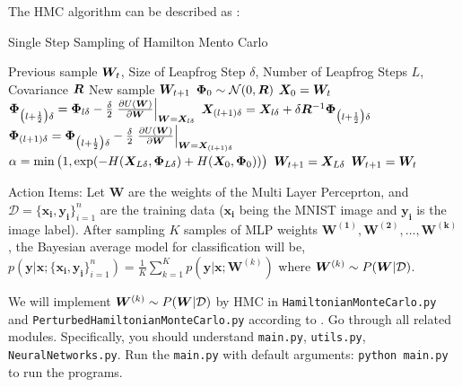 The HMC algorithm can be described as :
\begin{algorithm}
\caption{Single Step Sampling of Hamilton Mento Carlo}
\label{alg:hmc}
\begin{algorithmic}
\Require Previous sample $\bm{W}_{t}$, Size of Leapfrog Step $\delta$, Number of
Leapfrog Steps $L$, Covariance $\bm{R}$
\Ensure New sample $\bm{W}_{t + 1}$
\State $\bm{\Phi}_{0} \sim \mathcal{N}(0, \bm{R})$
\State $\bm{X}_{0} = \bm{W}_{t}$
    \State $\bm{\Phi}_{\big( l + \frac{1}{2} \big) \delta} = \bm{\Phi}_{l \delta} -
    \frac{\delta}{2} \left. \frac{\partial U(\bm{W})}{\partial \bm{W}}
    \right|_{\bm{W} = \bm{X}_{l \delta}}$
    \State $\bm{X}_{(l + 1) \delta} = \bm{X}_{l \delta} + \delta \bm{R}^{-1}
    \bm{\Phi}_{\big( l + \frac{1}{2} \big) \delta}$
    \State $\bm{\Phi}_{(l + 1) \delta} = \bm{\Phi}_{\big( l +
    \frac{1}{2} \big) \delta} - \frac{\delta}{2} \left. \frac{\partial U(\bm{W})}
    {\partial \bm{W}} \right|_{\bm{W} = \bm{X}_{(l + 1) \delta}}$
\EndFor
\State $\alpha = \min\big(1, \exp(-H(\bm{X}_{L \delta}, \bm{\Phi}_{L \delta}) +
H(\bm{X}_{0}, \bm{\Phi}_{0}))\big)$
    \State $\bm{W}_{t + 1} = \bm{X}_{L \delta}$
\Else
    \State $\bm{W}_{t + 1} = \bm{W}_{t}$
\EndIf
\end{algorithmic}
\end{algorithm}
%
\hfill

%
\hfill

%
\noindent Action Items:
%
Let $\mathbf{W}$ are the weights of the Multi Layer Perceprton, and $\mathcal{D} = \{\mathbf{x_i}, \mathbf{y_i}\}_{i=1}^n$ are the training data ($\mathbf{x_i}$ being the MNIST image and $\mathbf{y_i}$ is the image label). 
After sampling $K$ samples of MLP weights $\mathbf{W^{(1)}}, \mathbf{W^{(2)}}, \ldots, \mathbf{W^{(k)}}$, the Bayesian average model for classification will be,\\
$p(\mathbf{y}|\mathbf{x}; \{\mathbf{x_i}, \mathbf{y_i}\}_{i=1}^{n}) = \frac{1}{K}\sum_{k=1}^{K}p(\mathbf{y}|\mathbf{x}; \mathbf{W}^{(k)} )$ where $ \bm{W}^{(k)} \sim P(\bm{W} | \mathcal{D})$.
    
    We will implement $\bm{W}^{(k)} \sim P(\bm{W} | \mathcal{D})$ by HMC in \texttt{HamiltonianMonteCarlo.py} and \texttt{PerturbedHamiltonianMonteCarlo.py} 
    according to .
    Go through all related modules. Specifically, you should understand \texttt{main.py}, \texttt{utils.py}, \texttt{NeuralNetworks.py}.
    Run the \texttt{main.py} with default arguments: \texttt{python main.py} to run the programs.
    
